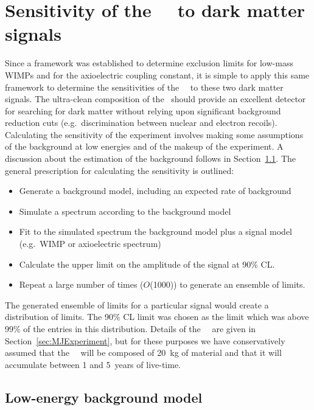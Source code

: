 	\section{Sensitivity of the \MJ~\minmod~to dark matter signals}
	\label{sec:MJSensitivity}
	
	Since a framework was established to determine exclusion limits for low-mass WIMPs and for the axioelectric coupling constant, it is simple to apply this same framework to determine the sensitivities of the \MJ~\minmod~to these two dark matter signals.  The ultra-clean composition of the \minmod~should provide an excellent detector for searching for dark matter without relying upon significant background reduction cuts (e.g.~discrimination between nuclear and electron recoils).  Calculating the sensitivity of the experiment involves making some assumptions of the background at low energies and of the makeup of the experiment.  A discussion about the estimation of the background follows in Section~\ref{sec:MJLowEnergyBackgroundModel}.  The general prescription for calculating the sensitivity is outlined:
	
		\begin{itemize}
			\item Generate a background model, including an expected rate of background
			\item Simulate a spectrum according to the background model
			\item Fit to the simulated spectrum the background model plus a signal model (e.g.~WIMP or axioelectric spectrum)
			\item Calculate the upper limit on the amplitude of the signal at 90\% CL.
			\item Repeat a large number of times ($O$(1000)) to generate an ensemble of limits.
		\end{itemize}	
		
The generated ensemble of limits for a particular signal would create a distribution of limits.  The 90\% CL limit was chosen as the limit which was above 99\% of the entries in this distribution.  Details of the \MJ~\minmod~are given in Section~\ref{sec:MJExperiment}, but for these purposes we have conservatively assumed that the \MJ~\minmod~will be composed of 20~kg of material and that it will accumulate between 1 and 5~years of live-time.  
	
		\subsection{Low-energy background model}
		\label{sec:MJLowEnergyBackgroundModel}
		
